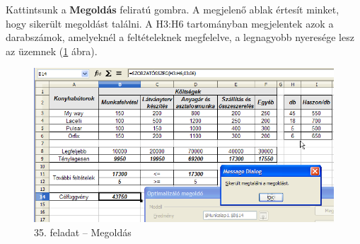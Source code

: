Kattintsunk a \textbf{Megoldás} feliratú gombra. A megjelenő
ablak értesít minket, hogy sikerült megoldást találni. A
H3:H6 tartományban megjelentek azok a darabszámok, amelyeknél a
feltételeknek megfelelve, a legnagyobb nyeresége lesz az üzemnek
(\ref{35-feladatMegoldás} ábra).

\begin{figure}[!h]
\begin{center}
\includegraphics[width=14.999cm]{oocalcv2-img172.png}
\caption{35. feladat --  Megoldás}\label{35-feladatMegoldás}
\end{center}
\end{figure}

